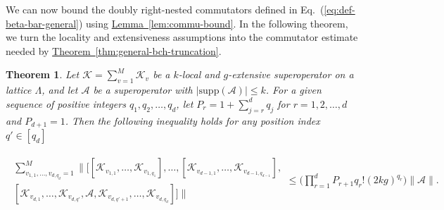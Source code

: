 \documentclass[aps,pra,reprint,groupedaddress,floatfix]{revtex4-2}
\newtheorem{theorem}{Theorem}
\newcommand{\eq}[1]{(\ref{eq:#1})}
\newcommand{\thm}[1]{\hyperref[thm:#1]{Theorem~\ref*{thm:#1}}}
\newcommand{\lem}[1]{\hyperref[lem:#1]{Lemma~\ref*{lem:#1}}}
\newcommand{\supp}{\mathrm{supp}}
\newcommand{\mc}{\mathcal}
\begin{document}
We can now bound the doubly right-nested commutators defined in Eq.~\eq{def-beta-bar-general} using \lem{commu-bound}. In the following theorem, we turn the locality and extensiveness assumptions into the commutator estimate needed by \thm{general-bch-truncation}.
\begin{theorem}\label{thm:doubly-nested-bound}
    Let $\mathcal{K} = \sum_{v=1}^{M} \mathcal{K}_{v}$ be a $k$-local and $g$-extensive superoperator on a lattice $\Lambda$, and let $\mathcal{A}$ be a superoperator with $|\supp(\mc A)|\le k$. For a given sequence of positive integers $q_1, q_2, \ldots, q_d$, let $P_{r} = 1+\sum_{j=r}^{d} q_j$ for $r=1, 2, \ldots, d$ and $P_{d+1}=1$. Then the following inequality holds for any position index $q' \in [q_d]$
    \begin{widetext}
    \begin{align}
    \label{eq:double-comm-k-local}
        \begin{multlined}
            \sum_{v_{1,1}, \ldots, v_{d, q_d}=1}^{M} \bigg\| \Big[ [\mathcal{K}_{v_{1,1}}, \ldots, \mathcal{K}_{v_{1, q_1}}], \ldots, [\mathcal{K}_{v_{d-1,1}}, \ldots, \mathcal{K}_{v_{d-1, q_{d-1}}}], \\
        [\mathcal{K}_{v_{d,1}}, \ldots, \mathcal{K}_{v_{d, q'}}, \mathcal{A}, \mathcal{K}_{v_{d, q'+1}}, \ldots, \mathcal{K}_{v_{d, q_d}}] \Big] \bigg\| 
        \end{multlined}\le \bigg(\prod_{r=1}^{d}P_{r+1} q_r!(2kg)^{q_r}\bigg)\|\mc A\|.
    \end{align}
    \end{widetext}
\end{theorem}
\end{document}
